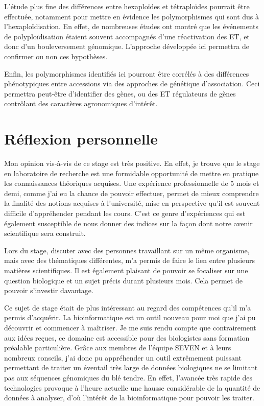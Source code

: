 \documentclass[a4paper, 12pt]{article}
\begin{document}
\begin{onehalfspace}
L'étude plus fine des différences entre hexaploïdes et tétraploïdes pourrait être effectuée, notamment pour mettre en évidence les polymorphismes qui sont dus à l'hexaploïdisation. En effet, de nombreuses études ont montré que les événements de polyploïdisation étaient souvent accompagnés d'une réactivation des ET, et donc d'un bouleversement génomique. L'approche développée ici permettra de confirmer ou non ces hypothèses.

Enfin, les polymorphismes identifiés ici pourront être corrélés à des différences phénotypiques entre accessions via des approches de génétique d'association. Ceci permettra peut-être d'identifier des gènes, ou des ET régulateurs de gènes contrôlant des caractères agronomiques d'intérêt.\\

\newpage
\thispagestyle{empty}
\null
\addtocounter{page}{-1}
\newpage


\part{Réflexion personnelle}
Mon opinion vis-à-vis de ce stage est très positive. En effet, je trouve que le stage en laboratoire de recherche est une formidable opportunité de mettre en pratique les connaissances théoriques acquises. Une expérience professionnelle de 5 mois et demi, comme j'ai eu la chance de pouvoir effectuer, permet de mieux comprendre la finalité des notions acquises à l'université, mise en perspective qu'il est souvent difficile d'appréhender pendant les cours. C'est ce genre d'expériences qui est également susceptible de nous donner des indices sur la façon dont notre avenir scientifique sera construit.

Lors du stage, discuter avec des personnes travaillant sur un même organisme, mais avec des thématiques différentes, m'a permis de faire le lien entre plusieurs matières scientifiques. Il est également plaisant de pouvoir se focaliser sur une question biologique et un sujet précis durant plusieurs mois. Cela permet de pouvoir s'investir davantage.

Ce sujet de stage était de plus intéressant au regard des compétences qu'il m'a permis d'acquérir. La bioinformatique est un outil nouveau pour moi que j'ai pu découvrir et commencer à maîtriser. Je me suis rendu compte que contrairement aux idées reçues, ce domaine est accessible pour des biologistes sans formation préalable particulière. Grâce aux membres de l'équipe SEVEN et à leurs nombreux conseils, j'ai donc pu appréhender un outil extrêmement puissant permettant de traiter un éventail très large de données biologiques ne se limitant pas aux séquences génomiques du blé tendre. En effet, l'avancée très rapide des technologies provoque à l'heure actuelle une hausse considérable de la quantité de données à analyser, d'où l'intérêt de la bioinformatique pour pouvoir les traiter.


\end{onehalfspace}
\end{document}

